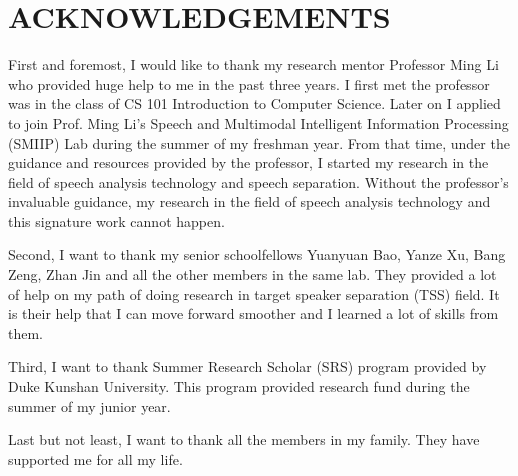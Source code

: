 

\section{ACKNOWLEDGEMENTS}\label{sec:acknowledgements}
First and foremost, I would like to thank my research mentor Professor Ming Li who provided huge help to me in the past three years.
I first met the professor was in the class of CS 101 Introduction to Computer Science.
Later on I applied to join Prof. Ming Li's Speech and Multimodal Intelligent Information Processing (SMIIP) Lab during the summer of my freshman year.
From that time, under the guidance and resources provided by the professor, I started my research in the field of speech analysis technology and speech separation.
Without the professor's invaluable guidance, my research in the field of speech analysis technology and this signature work cannot happen.

Second, I want to thank my senior schoolfellows Yuanyuan Bao, Yanze Xu, Bang Zeng, Zhan Jin and all the other members in the same lab.
They provided a lot of help on my path of doing research in target speaker separation (TSS) field.
It is their help that I can move forward smoother and I learned a lot of skills from them.

Third, I want to thank Summer Research Scholar (SRS) program provided by Duke Kunshan University.
This program provided research fund during the summer of my junior year.

Last but not least, I want to thank all the members in my family. They have supported me for all my life.
